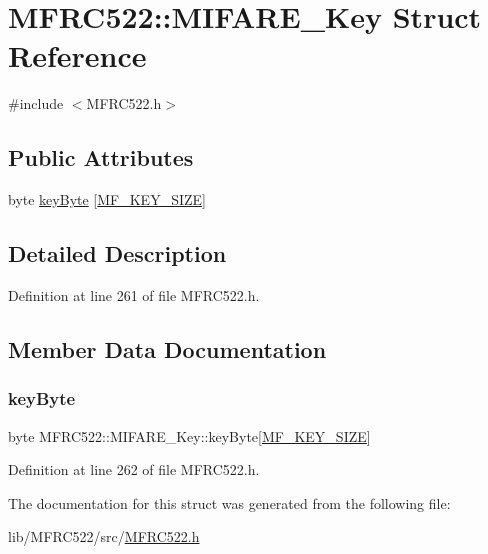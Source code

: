 \hypertarget{struct_m_f_r_c522_1_1_m_i_f_a_r_e___key}{}\section{M\+F\+R\+C522\+:\+:M\+I\+F\+A\+R\+E\+\_\+\+Key Struct Reference}
\label{struct_m_f_r_c522_1_1_m_i_f_a_r_e___key}


{\ttfamily \#include $<$M\+F\+R\+C522.\+h$>$}

\subsection*{Public Attributes}
\begin{DoxyCompactItemize}
\item 
byte \hyperlink{struct_m_f_r_c522_1_1_m_i_f_a_r_e___key_af4b154f686bfbb46e6ee780ce154cefa}{key\+Byte} \mbox{[}\hyperlink{class_m_f_r_c522_a92c17a5b83cc4fde3cc3454c03b8eedea410c51021b253b680b7ec518ccc818ce}{M\+F\+\_\+\+K\+E\+Y\+\_\+\+S\+I\+ZE}\mbox{]}
\end{DoxyCompactItemize}


\subsection{Detailed Description}


Definition at line 261 of file M\+F\+R\+C522.\+h.



\subsection{Member Data Documentation}
\mbox{\label{struct_m_f_r_c522_1_1_m_i_f_a_r_e___key_af4b154f686bfbb46e6ee780ce154cefa}} 
\subsubsection{\texorpdfstring{key\+Byte}{keyByte}}
{\footnotesize\ttfamily byte M\+F\+R\+C522\+::\+M\+I\+F\+A\+R\+E\+\_\+\+Key\+::key\+Byte\mbox{[}\hyperlink{class_m_f_r_c522_a92c17a5b83cc4fde3cc3454c03b8eedea410c51021b253b680b7ec518ccc818ce}{M\+F\+\_\+\+K\+E\+Y\+\_\+\+S\+I\+ZE}\mbox{]}}



Definition at line 262 of file M\+F\+R\+C522.\+h.



The documentation for this struct was generated from the following file\+:\begin{DoxyCompactItemize}
\item 
lib/\+M\+F\+R\+C522/src/\hyperlink{_m_f_r_c522_8h}{M\+F\+R\+C522.\+h}\end{DoxyCompactItemize}
